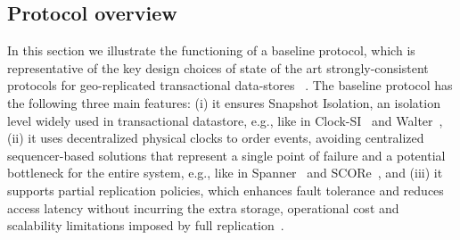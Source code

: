 \subsection{Protocol overview}
\label{subsec:overview}
\iffalse
In this section we illustrate the functioning of a baseline protocol, which is representative of the key design choices of state of the art strongly-consistent  protocols for geo-replicated transactional data-stores~ \cite{spanner, cockroach, terry2013consistency}. The baseline protocol has the following three main features: (i) it ensures Snapshot Isolation, an isolation level widely used in transactional datastore, e.g., like in Clock-SI~\cite{clocksi} and Walter~\cite{sovran2011transactional}, (ii) it uses decentralized physical clocks to order events, avoiding centralized sequencer-based solutions that represent a single point of failure and a potential bottleneck for the entire system, e.g., like in Spanner~\cite{spanner} and SCORe~\cite{peluso2012score}, and (iii) it supports partial replication policies, which enhances fault tolerance and reduces access latency without incurring the extra storage, operational cost and scalability limitations imposed by full replication~\cite{bettina-partial}.

